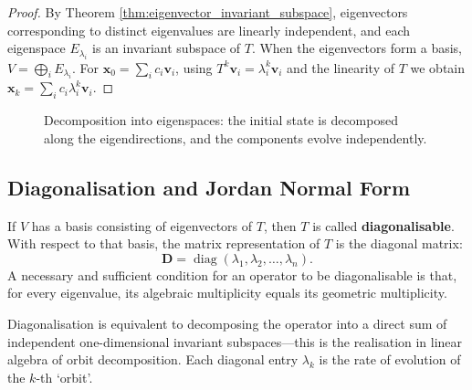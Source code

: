 \begin{proof}
By Theorem \ref{thm:eigenvector_invariant_subspace}, eigenvectors corresponding to distinct eigenvalues are linearly independent, and each eigenspace $E_{\lambda_i}$ is an invariant subspace of $T$. When the eigenvectors form a basis, $V = \bigoplus_i E_{\lambda_i}$. For $\mathbf{x}_0 = \sum_i c_i \mathbf{v}_i$, using $T^k \mathbf{v}_i = \lambda_i^k \mathbf{v}_i$ and the linearity of $T$ we obtain $\mathbf{x}_k = \sum_i c_i \lambda_i^k \mathbf{v}_i$.
\end{proof}

\begin{figure}[htbp]
\centering
{}
\caption{Decomposition into eigenspaces: the initial state is decomposed along the eigendirections, and the components evolve independently.}
\label{fig:eigenspace_decomposition}
\end{figure}


\subsection{\texorpdfstring{Diagonalisation and Jordan Normal Form}{Diagonalisation and Jordan Normal Form}}

\begin{definition}\label{def:diagonalisable}
If $V$ has a basis consisting of eigenvectors of $T$, then $T$ is called \textbf{diagonalisable}. With respect to that basis, the matrix representation of $T$ is the diagonal matrix:
\[
\mathbf{D} = \operatorname{diag}(\lambda_1, \lambda_2, \dots, \lambda_n).
\]
A necessary and sufficient condition for an operator to be diagonalisable is that, for every eigenvalue, its algebraic multiplicity equals its geometric multiplicity.

Diagonalisation is equivalent to decomposing the operator into a direct sum of independent one-dimensional invariant subspaces---this is the realisation in linear algebra of orbit decomposition. Each diagonal entry $\lambda_k$ is the rate of evolution of the $k$-th `orbit'.
\end{definition}

